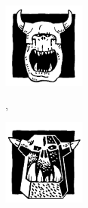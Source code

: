 \newcommand{\logosize}{3cm}
\begin{multicols}{3}\raggedcolumns

\begin{center}
\includegraphics[width=\logosize]{pics/commonorc.png}
\vspace*{-1cm}\subsubtitle{\commonorc}

\unruly{}, \borntofight{}
\end{center}

\columnbreak

\begin{center}
\includegraphics[width=\logosize]{pics/ironorc.png}
\vspace*{-1cm}\subsubtitle{\ironorc}


\end{center}
\end{multicols}
